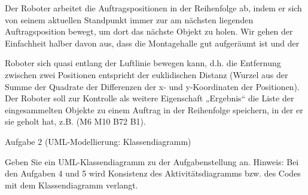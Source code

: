 \documentclass{lehramt-informatik-aufgabe}
\begin{document}
Der Roboter arbeitet die Auftragspositionen in der Reihenfolge ab, indem
er sich von seinem aktuellen Standpunkt immer zur am nächsten liegenden
Auftragsposition bewegt, um dort das nächste Objekt zu holen. Wir gehen
der Einfachheit halber davon aus, dass die Montagehalle gut aufgeräumt
ist und der

Roboter sich quasi entlang der Luftlinie bewegen kann, d.h. die
Entfernung zwischen zwei Positionen entspricht der euklidischen Distanz
(Wurzel aus der Summe der Quadrate der Differenzen der x- und
y-Koordinaten der Positionen). Der Roboter soll zur Kontrolle als
weitere Eigenschaft „Ergebnis“ die Liste der eingesammelten Objekte zu
einem Auftrag in der Reihenfolge speichern, in der er sie geholt hat,
z.B. (M6 M10 B72 B1).

Aufgabe 2 (UML-Modellierung: Klassendiagramm)

Geben Sie ein UML-Klassendiagramm zu der Aufgabenstellung an. Hinweis:
Bei den Aufgaben 4 und 5 wird Konsistenz des Aktivitätsdiagramms bzw.
des Codes mit dem Klassendiagramm verlangt.

\begin{liAntwort}
\end{liAntwort}
\end{document}
